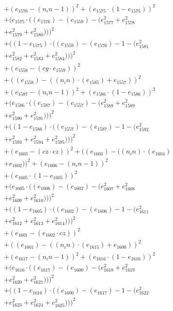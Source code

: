\documentclass[10pt, a4paper]{article}
\begin{document}
\begin{small}
\begin{align*}
& + (e_{1576} - (n_in - 1))^{2} + (e_{1575}  \cdot  (1 - e_{1575}))^{2} \\
& + (e_{1575}  \cdot  ((e_{1576}) - (e_{1559}) - (e_{1577}^{2} + e_{1578}^{2} \\
& + e_{1579}^{2} + e_{1580}^{2})))^{2} \\
& + ((1 - e_{1575})  \cdot  ((e_{1559}) - (e_{1576}) - 1 - (e_{1581}^{2} \\
& + e_{1582}^{2} + e_{1583}^{2} + e_{1584}^{2})))^{2} \\
& + (e_{1558} - (cy  \cdot  e_{1559}))^{2} \\
& + ((e_{1558}) - ((n_in)  \cdot  (e_{1585}) + e_{1557}))^{2} \\
& + (e_{1587} - (n_in - 1))^{2} + (e_{1586}  \cdot  (1 - e_{1586}))^{2} \\
& + (e_{1586}  \cdot  ((e_{1587}) - (e_{1557}) - (e_{1588}^{2} + e_{1589}^{2} \\
& + e_{1590}^{2} + e_{1591}^{2})))^{2} \\
& + ((1 - e_{1586})  \cdot  ((e_{1557}) - (e_{1587}) - 1 - (e_{1592}^{2} \\
& + e_{1593}^{2} + e_{1594}^{2} + e_{1595}^{2})))^{2} \\
& + (e_{1603} - (cz  \cdot  cz))^{2} + ((e_{1603}) - ((n_in)  \cdot  (e_{1604}) \\
& + e_{1602}))^{2} + (e_{1606} - (n_in - 1))^{2} \\
& + (e_{1605}  \cdot  (1 - e_{1605}))^{2} \\
& + (e_{1605}  \cdot  ((e_{1606}) - (e_{1602}) - (e_{1607}^{2} + e_{1608}^{2} \\
& + e_{1609}^{2} + e_{1610}^{2})))^{2} \\
& + ((1 - e_{1605})  \cdot  ((e_{1602}) - (e_{1606}) - 1 - (e_{1611}^{2} \\
& + e_{1612}^{2} + e_{1613}^{2} + e_{1614}^{2})))^{2} \\
& + (e_{1601} - (e_{1602}  \cdot  cz))^{2} \\
& + ((e_{1601}) - ((n_in)  \cdot  (e_{1615}) + e_{1600}))^{2} \\
& + (e_{1617} - (n_in - 1))^{2} + (e_{1616}  \cdot  (1 - e_{1616}))^{2} \\
& + (e_{1616}  \cdot  ((e_{1617}) - (e_{1600}) - (e_{1618}^{2} + e_{1619}^{2} \\
& + e_{1620}^{2} + e_{1621}^{2})))^{2} \\
& + ((1 - e_{1616})  \cdot  ((e_{1600}) - (e_{1617}) - 1 - (e_{1622}^{2} \\
& + e_{1623}^{2} + e_{1624}^{2} + e_{1625}^{2})))^{2} \\

\end{align*}
\end{small}
\end{document}
